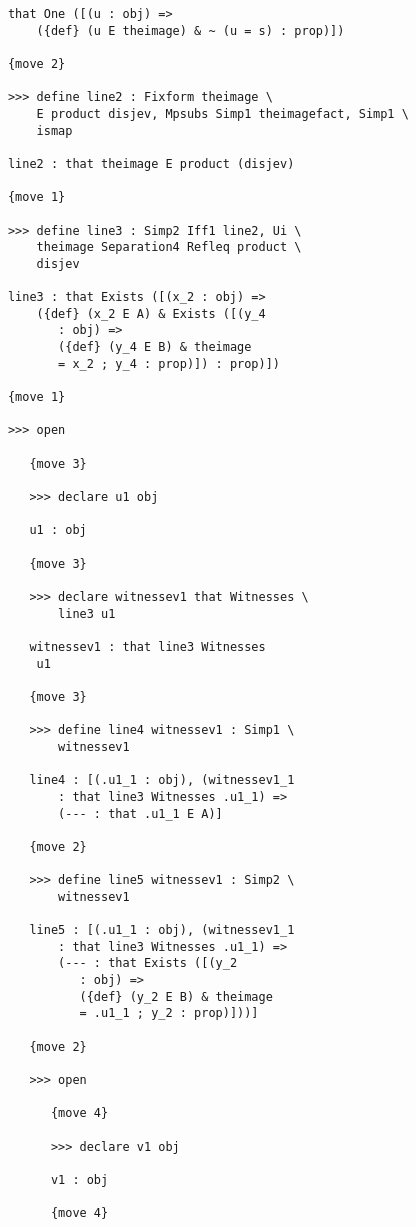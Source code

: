\documentclass[12pt]{article}
\begin{document}
\begin{verbatim}
      that One ([(u : obj) => 
          ({def} (u E theimage) & ~ (u = s) : prop)])

      {move 2}

      >>> define line2 : Fixform theimage \
          E product disjev, Mpsubs Simp1 theimagefact, Simp1 \
          ismap

      line2 : that theimage E product (disjev)

      {move 1}

      >>> define line3 : Simp2 Iff1 line2, Ui \
          theimage Separation4 Refleq product \
          disjev

      line3 : that Exists ([(x_2 : obj) => 
          ({def} (x_2 E A) & Exists ([(y_4 
             : obj) => 
             ({def} (y_4 E B) & theimage 
             = x_2 ; y_4 : prop)]) : prop)])

      {move 1}

      >>> open

         {move 3}

         >>> declare u1 obj

         u1 : obj

         {move 3}

         >>> declare witnessev1 that Witnesses \
             line3 u1

         witnessev1 : that line3 Witnesses 
          u1

         {move 3}

         >>> define line4 witnessev1 : Simp1 \
             witnessev1

         line4 : [(.u1_1 : obj), (witnessev1_1 
             : that line3 Witnesses .u1_1) => 
             (--- : that .u1_1 E A)]

         {move 2}

         >>> define line5 witnessev1 : Simp2 \
             witnessev1

         line5 : [(.u1_1 : obj), (witnessev1_1 
             : that line3 Witnesses .u1_1) => 
             (--- : that Exists ([(y_2 
                : obj) => 
                ({def} (y_2 E B) & theimage 
                = .u1_1 ; y_2 : prop)]))]

         {move 2}

         >>> open

            {move 4}

            >>> declare v1 obj

            v1 : obj

            {move 4}


\end{verbatim}
\end{document}
